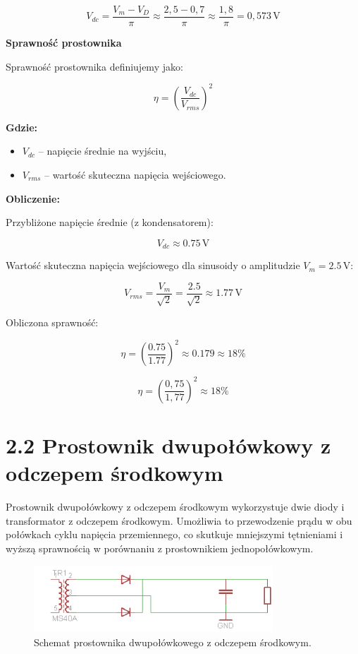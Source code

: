 \documentclass[a4paper,12pt]{article}
\begin{document}
\[
V_{dc} = \frac{V_m- V_D}{\pi}  \approx \frac{2{,}5- 0{,}7}{\pi}  \approx \frac{1{,}8}{\pi} = 0{,}573\,\text{V}
\]


\textbf{Sprawność prostownika}

Sprawność prostownika definiujemy jako:

\[
\eta = \left( \frac{V_{dc}}{V_{rms}} \right)^2
\]

\textbf{Gdzie:}

\begin{itemize}
    \item $V_{dc}$ – napięcie średnie na wyjściu,
    \item $V_{rms}$ – wartość skuteczna napięcia wejściowego.
\end{itemize}

\textbf{Obliczenie:}

Przybliżone napięcie średnie (z kondensatorem):

\[
V_{dc} \approx 0.75\,\text{V}
\]

Wartość skuteczna napięcia wejściowego dla sinusoidy o amplitudzie $V_m = 2.5\,\text{V}$:

\[
V_{rms} = \frac{V_m}{\sqrt{2}} = \frac{2.5}{\sqrt{2}} \approx 1.77\,\text{V}
\]

Obliczona sprawność:

\[
\eta = \left( \frac{0.75}{1.77} \right)^2 \approx 0.179 \approx 18\%
\]

\[
\eta = \left(\frac{0{,}75}{1{,}77}\right)^2 \approx 18\%
\]
\section*{2.2 Prostownik dwupołówkowy z odczepem środkowym}

Prostownik dwupołówkowy z odczepem środkowym wykorzystuje dwie diody i transformator z odczepem środkowym. Umożliwia to przewodzenie prądu w obu połówkach cyklu napięcia przemiennego, co skutkuje mniejszymi tętnieniami i wyższą sprawnością w porównaniu z prostownikiem jednopołówkowym.

\begin{figure}[H]
    \centering
    \includegraphics[width=0.8\textwidth]{5.png}
    \caption{Schemat prostownika dwupołówkowego z odczepem środkowym.}
    \label{fig:schemat_dwu}
\end{figure}
\end{document}

